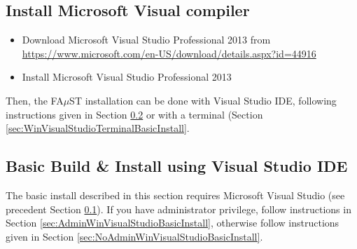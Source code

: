 
\subsection{Install Microsoft Visual compiler}\label{sec:WinInstallCompilerVS} 

\begin{itemize}
\item Download Microsoft Visual Studio Professional 2013 from \url{https://www.microsoft.com/en-US/download/details.aspx?id=44916}
\item Install Microsoft Visual Studio Professional 2013
\end{itemize}
Then, the FA$\mu$ST installation can be done with Visual Studio IDE, following instructions given in Section \ref{sec:WinVisualStudioBasicInstall} or with a terminal (Section \ref{sec:WinVisualStudioTerminalBasicInstall}. 

\subsection{Basic Build \& Install using Visual Studio IDE}\label{sec:WinVisualStudioBasicInstall}
The basic install described in this section requires Microsoft Visual Studio (see precedent Section \ref{sec:WinInstallCompilerVS}).
If you have administrator privilege, follow instructions in Section \ref{sec:AdminWinVisualStudioBasicInstall}, otherwise follow instructions given in Section \ref{sec:NoAdminWinVisualStudioBasicInstall}.


